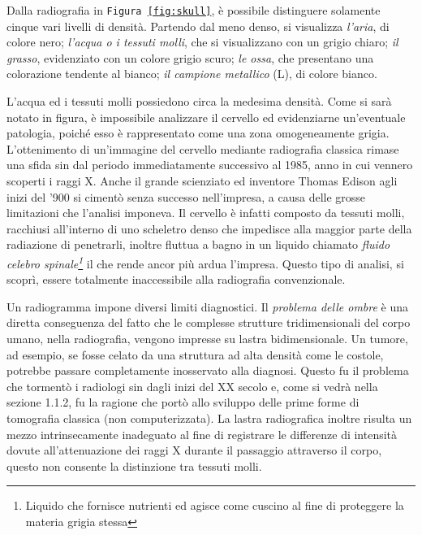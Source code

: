 \documentclass[a4paper,11pt, oneside]{article}
\begin{document}
                    Dalla radiografia in \texttt{Figura \ref{fig:skull}}, è possibile distinguere solamente cinque vari livelli di densità. Partendo dal meno denso, si visualizza \textit{l'aria}, di colore nero; \textit{l'acqua o i tessuti molli}, che si visualizzano con un grigio chiaro; \textit{il grasso}, evidenziato con un colore grigio scuro; \textit{le ossa}, che presentano una colorazione tendente al bianco; \textit{il campione metallico} (L), di colore bianco.
                            

                            
                \par 
                    L’acqua ed i tessuti molli possiedono circa la medesima densità. Come si sarà notato in figura, è impossibile analizzare il cervello ed evidenziarne un'eventuale patologia, poiché esso è rappresentato come una zona omogeneamente grigia. L'ottenimento di un'immagine del cervello mediante radiografia classica rimase una sfida sin dal periodo immediatamente successivo al 1985, anno in cui vennero scoperti i raggi X. Anche il grande scienziato ed inventore Thomas Edison agli inizi del '900 si cimentò senza successo nell'impresa, a causa delle grosse limitazioni che l'analisi imponeva.\cite{thomas-edison-brain} Il cervello è infatti composto da tessuti molli, racchiusi all’interno di uno scheletro denso che impedisce alla maggior parte della radiazione di penetrarli, inoltre fluttua a bagno in un liquido chiamato \textit{fluido celebro spinale\footnote{Liquido che fornisce nutrienti ed agisce come cuscino al fine di proteggere la materia grigia stessa}} il che rende ancor più ardua l'impresa. Questo tipo di analisi, si scoprì, essere totalmente inaccessibile alla radiografia convenzionale.
                            
                \par
                    Un radiogramma impone diversi limiti diagnostici. Il \textit{problema delle ombre} è una diretta conseguenza del fatto che le complesse strutture tridimensionali del corpo umano, nella radiografia, vengono impresse su lastra bidimensionale. Un tumore, ad esempio, se fosse celato da una struttura ad alta densità come le costole, potrebbe passare completamente inosservato alla diagnosi. Questo fu il problema che tormentò i radiologi sin dagli inizi del XX secolo e, come si vedrà nella sezione 1.1.2, fu la ragione che portò allo sviluppo delle prime forme di tomografia classica (non computerizzata).
                    La lastra radiografica inoltre risulta un mezzo intrinsecamente inadeguato al fine di registrare le differenze di intensità dovute all'attenuazione dei raggi X durante il passaggio attraverso il corpo, questo non consente la distinzione tra tessuti molli.
                            
\end{document}
